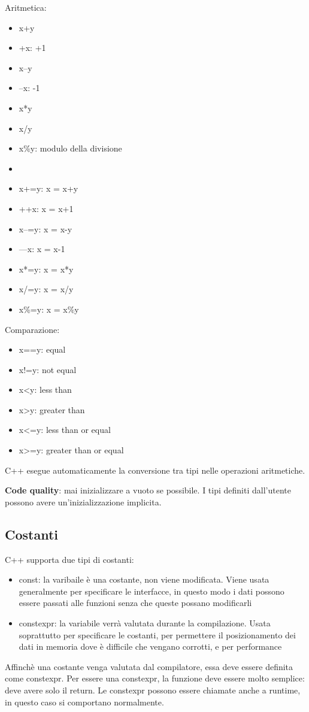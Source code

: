 \documentclass[11pt,a4paper]{book}
\begin{document}
Aritmetica:
\begin{itemize}
	\item x+y
	\item +x: +1
	\item x–y
	\item –x: -1
	\item x*y
	\item x/y
	\item x\%y: modulo della divisione
	\item
	\item x+=y: x = x+y
	\item ++x: x = x+1
	\item x–=y: x = x-y
	\item ––x: x = x-1
	\item x*=y: x = x*y
	\item x/=y: x = x/y
	\item x\%=y: x = x\%y
\end{itemize}

Comparazione:
\begin{itemize}
	\item x==y: equal
	\item x!=y: not equal
	\item x<y: less than
	\item x>y: greater than
	\item x<=y: less than or equal
	\item x>=y: greater than or equal
\end{itemize}

C++ esegue automaticamente la conversione tra tipi nelle operazioni aritmetiche.

\textbf{Code quality}: mai inizializzare a vuoto se possibile. I tipi definiti dall'utente possono avere un'inizializzazione implicita. \label{Code quality: 001}

\subsection{Costanti}
C++ supporta due tipi di costanti:
\begin{itemize}
	\item const: la varibaile è una costante, non viene modificata. Viene usata generalmente per specificare le interfacce, in questo modo i dati possono essere passati alle funzioni senza che queste possano modificarli
	\item constexpr: la variabile verrà valutata durante la compilazione. Usata soprattutto per specificare le costanti, per permettere il posizionamento dei dati in memoria dove è difficile che vengano corrotti, e per performance
\end{itemize}
\label{code: 003}
Affinchè una costante venga valutata dal compilatore, essa deve essere definita come constexpr. Per essere una constexpr, la funzione deve essere molto semplice: deve avere solo il return. Le constexpr possono essere chiamate anche a runtime, in questo caso si comportano normalmente.
\end{document}
